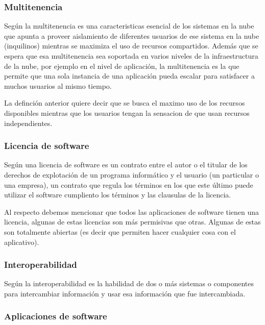 \subsubsection{Multitenencia}

Seg\'un \cite{chandra} la multitenencia es una caracteristicas esencial de los
sistemas en la nube que apunta a proveer aislamiento de diferentes usuarios de
ese sistema en la nube (inquilinos) mientras se maximiza el uso de recursos compartidos.
Adem\'as \citep{chandra} que se espera que esa multitenencia sea soportada en varios niveles de la infraestructura
de la nube, por ejemplo en el nivel de aplicaci\'on, la multitenencia es la que permite
que una sola instancia de una aplicaci\'on pueda escalar para satisfacer a muchos
usuarios al mismo tiempo.

La definci\'on anterior quiere decir que se busca el maximo uso de los recursos
disponibles mientras que los usuarios tengan la sensacion de que usan recursos
independientes.
\subsubsection{Licencia de software}
Seg\'un \cite{moro} una licencia de software es un contrato entre el autor o el titular
de los derechos de explotaci\'on de un programa inform\'atico y el usuario (un particular
o una empresa), un contrato que regula los t\'erminos en los que este \'ultimo puede
utilizar el software cumpliento los t\'erminos y las clausulas de la licencia.

Al respecto debemos mencionar que todos las aplicaciones de software tienen una
licencia, algunas de estas licencias son m\'as permisivas que otras. Algunas de estas
son totalmente abiertas (es decir que permiten hacer cualquier cosa con el aplicativo).
\subsubsection{Interoperabilidad}
Seg\'un \cite{kajan} la interoperabilidad es la habilidad de dos o m\'as sistemas o
componentes para intercambiar informaci\'on y usar esa informaci\'on que fue intercambiada.
\subsubsection{Aplicaciones de software}

